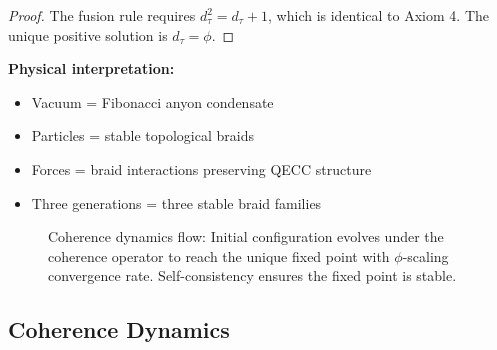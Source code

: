 \documentclass[11pt]{article}
\theoremstyle{definition}
\newcommand{\goldenratio}{\phi}
\newcommand{\coherence}{\mathcal{C}}
\newcommand{\density}{\rho}
\newcommand{\fibonacci}{\tau}
\begin{document}
\begin{proof}
The fusion rule requires $d_\fibonacci^2 = d_\fibonacci + 1$, which is identical to Axiom 4. The unique positive solution is $d_\fibonacci = \goldenratio$.
\end{proof}

\textbf{Physical interpretation:}
\begin{itemize}
\item Vacuum = Fibonacci anyon condensate
\item Particles = stable topological braids
\item Forces = braid interactions preserving QECC structure
\item Three generations = three stable braid families
\end{itemize}

\begin{figure}[H]
\centering
{}
\caption{Coherence dynamics flow: Initial configuration evolves under the coherence operator to reach the unique fixed point with $\goldenratio$-scaling convergence rate. Self-consistency ensures the fixed point is stable.}
\label{fig:coherence_dynamics}
\end{figure}

\vspace{0.3cm}

\subsection{Coherence Dynamics}
\end{document}
